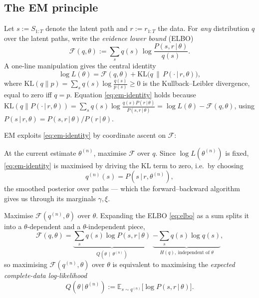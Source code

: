 \documentclass[11pt]{article}
\newcommand{\E}{\mathbb{E}}
\newcommand{\KL}{\mathrm{KL}}
\newcommand{\given}{\,\vert\,}
\newcommand{\eqdef}{:=}
\newcommand{\state}{S}
\newcommand{\obs}{r}
\theoremstyle{plain}
\theoremstyle{definition}
\theoremstyle{remark}
\begin{document}
\subsection{The EM principle}\label{sec:em-principle}

Let $s\eqdef\state_{1:T}$ denote the latent path and $r\eqdef\obs_{1:T}$ the
data. For \emph{any} distribution $q$ over the latent paths, write the
\emph{evidence lower bound} (ELBO)
\begin{equation}\label{eq:elbo}
  \mathcal{F}(q,\theta) \eqdef \sum_{s} q(s)\,\log\frac{P(s,r\given\theta)}{q(s)} .
\end{equation}
A one-line manipulation gives the central identity
\begin{equation}\label{eq:em-identity}
  \log L(\theta) = \mathcal{F}(q,\theta) + \KL\!\big(q \,\big\|\, P(\cdot\given r,\theta)\big),
\end{equation}
where $\KL(q\|p)=\sum_s q(s)\log\frac{q(s)}{p(s)}\ge 0$ is the
Kullback--Leibler divergence, equal to zero iff $q=p$. Equation
\eqref{eq:em-identity} holds because
$\KL(q\|P(\cdot\given r,\theta))=\sum_s q(s)\log\frac{q(s)P(r\given\theta)}{P(s,r\given\theta)}
=\log L(\theta)-\mathcal F(q,\theta)$, using $P(s\given r,\theta)=P(s,r\given\theta)/P(r\given\theta)$.

EM exploits \eqref{eq:em-identity} by coordinate ascent on $\mathcal F$:
\begin{description}[leftmargin=2.2em,style=nextline]
  \item[E-step] At the current estimate $\theta^{(n)}$, maximise $\mathcal F$ over
        $q$. Since $\log L(\theta^{(n)})$ is fixed, \eqref{eq:em-identity} is
        maximised by driving the KL term to zero, i.e.\ by choosing
        \[
          q^{(n)}(s) = P(s\given r,\theta^{(n)}),
        \]
        the smoothed posterior over paths --- which the forward--backward
        algorithm gives us through its marginals $\gamma,\xi$.
  \item[M-step] Maximise $\mathcal F(q^{(n)},\theta)$ over $\theta$. Expanding the
        ELBO \eqref{eq:elbo} as a sum splits it into a $\theta$-dependent and a
        $\theta$-independent piece,
        \begin{equation}\label{eq:F-split}
          \mathcal F(q,\theta)
          = \underbrace{\sum_s q(s)\log P(s,r\given\theta)}_{\displaystyle Q(\theta\,\mid\,\theta^{(n)})}
          \;\underbrace{-\sum_s q(s)\log q(s)}_{\displaystyle H(q),\ \text{independent of }\theta},
        \end{equation}
        so maximising $\mathcal F(q^{(n)},\theta)$ over $\theta$ is equivalent to
        maximising the \emph{expected complete-data log-likelihood}
        \begin{equation}\label{eq:Qfun}
          Q(\theta\given\theta^{(n)}) \eqdef \E_{s\sim q^{(n)}}\!\big[\log P(s,r\given\theta)\big].
        \end{equation}
\end{description}
\end{document}
